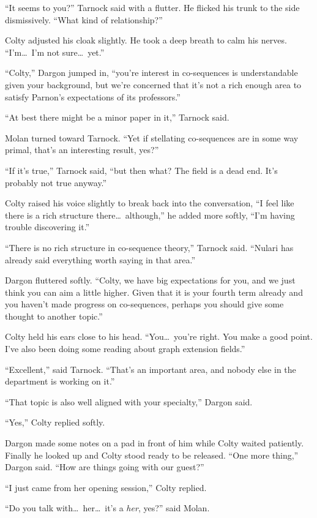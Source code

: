 ``It seems to you?'' Tarnock said with a flutter. He flicked his trunk to the side dismissively.
``What kind of relationship?''

Colty adjusted his cloak slightly. He took a deep breath to calm his nerves. ``I'm\ldots\ I'm
not sure\ldots\ yet.''

``Colty,'' Dargon jumped in, ``you're interest in co-sequences is understandable given your
background, but we're concerned that it's not a rich enough area to satisfy Parnon's
expectations of its professors.''

``At best there might be a minor paper in it,'' Tarnock said.

Molan turned toward Tarnock. ``Yet if stellating co-sequences are in some way primal, that's an
interesting result, yes?''

``If it's true,'' Tarnock said, ``but then what? The field is a dead end. It's probably not true
anyway.''

Colty raised his voice slightly to break back into the conversation, ``I feel like there is a
rich structure there\ldots\ although,'' he added more softly, ``I'm having trouble discovering
it.''

``There is no rich structure in co-sequence theory,'' Tarnock said. ``Nulari has already said
everything worth saying in that area.''

Dargon fluttered softly. ``Colty, we have big expectations for you, and we just think you can
aim a little higher. Given that it is your fourth term already and you haven't made progress on
co-sequences, perhaps you should give some thought to another topic.''

Colty held his ears close to his head. ``You\ldots\ you're right. You make a good point. I've
also been doing some reading about graph extension fields.''

``Excellent,'' said Tarnock. ``That's an important area, and nobody else in the department is
working on it.''

``That topic is also well aligned with your specialty,'' Dargon said.

``Yes,'' Colty replied softly.

Dargon made some notes on a pad in front of him while Colty waited patiently. Finally he looked
up and Colty stood ready to be released. ``One more thing,'' Dargon said. ``How are things going
with our guest?''

``I just came from her opening session,'' Colty replied.

``Do you talk with\ldots\ her\ldots\ it's a \emph{her}, yes?'' said Molan.

